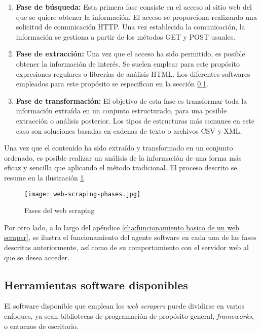 \begin{enumerate}
\item {\bfseries Fase de búsqueda:} Esta primera fase consiste en el acceso al sitio web del que se
quiere obtener la información. El acceso se proporciona realizando una solicitud de comunicación HTTP.
Una vez establecida la comunicación, la información se gestiona a partir de los métodos GET y POST usuales.

\item {\bfseries Fase de extracción:} Una vez que el acceso ha sido permitido, es posible obtener la
información de interés. Se suelen emplear para este propósito expresiones regulares o librerías de
análisis HTML. Los diferentes softwares empleados para este propósito se especifican en la sección
\ref{subsec:herramientas software disponibles}.

\item {\bfseries Fase de transformación:} El objetivo de esta fase es transformar toda la información
extraída en un conjunto estructurado, para una posible extracción o análisis posterior. Los tipos de
estructuras más comunes en este caso son soluciones basadas en cadenas de texto o archivos CSV y XML.
\end{enumerate}

Una vez que el contenido ha sido extraído y transformado en un conjunto ordenado, es posible realizar un
análisis de la información de una forma más eficaz y sencilla que aplicando el método tradicional. El
proceso descrito se resume en la ilustración \ref{img:web-scraping-phases}.

\begin{figure}[tphb]
\centering
\texttt{[image: web-scraping-phases.jpg]}
\caption{Fases del web scraping}
\label{img:web-scraping-phases}
\end{figure}

Por otro lado, a lo largo del apéndice \ref{cha:funcionamiento basico de un web scraper}, se ilustra el
funcionamiento del agente software en cada una de las fases descritas anteriormente, así como de su
comportamiento con el servidor web al que se desea acceder.

\subsection{Herramientas software disponibles}
\label{subsec:herramientas software disponibles}

El software disponible que emplean los \emph{web scrapers} puede dividirse en varios enfoques, ya sean 
bibliotecas de programación de propósito general, \emph{frameworks}, o entornos de escritorio.

